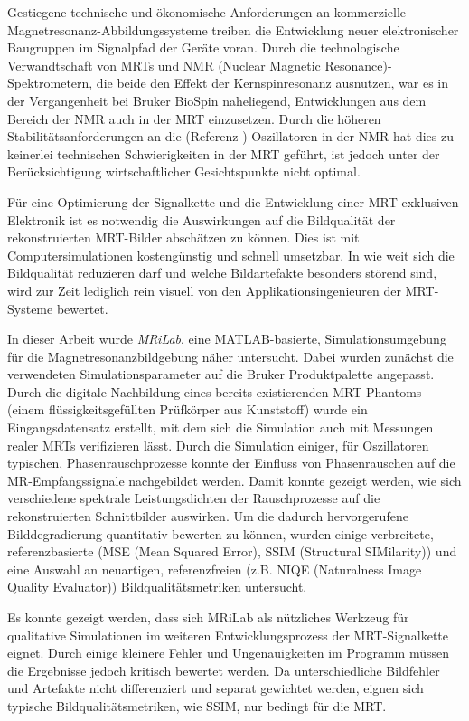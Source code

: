 Gestiegene technische und ökonomische Anforderungen an kommerzielle Magnetresonanz-Abbildungssysteme treiben die Entwicklung neuer elektronischer Baugruppen im Signalpfad der Geräte voran. Durch die technologische Verwandtschaft von MRTs und NMR (Nuclear Magnetic Resonance)-Spektrometern, die beide den Effekt der Kernspinresonanz ausnutzen, war es in der Vergangenheit bei Bruker BioSpin naheliegend, Entwicklungen aus dem Bereich der NMR auch in der MRT einzusetzen. Durch die höheren Stabilitätsanforderungen an die (Referenz-) Oszillatoren in der NMR hat dies zu keinerlei technischen Schwierigkeiten in der MRT geführt, ist jedoch unter der Berücksichtigung wirtschaftlicher Gesichtspunkte nicht optimal.

Für eine Optimierung der Signalkette und die Entwicklung einer MRT exklusiven Elektronik ist es notwendig die Auswirkungen auf die Bildqualität der rekonstruierten MRT-Bilder abschätzen zu können. Dies ist mit Computersimulationen kostengünstig und schnell umsetzbar. In wie weit sich die Bildqualität reduzieren darf und welche Bildartefakte besonders störend sind, wird zur Zeit lediglich rein visuell von den Applikationsingenieuren der MRT-Systeme bewertet.

In dieser Arbeit wurde \textit{MRiLab}, eine MATLAB-basierte, Simulationsumgebung für die Magnetresonanzbildgebung näher untersucht. Dabei wurden zunächst die verwendeten Simulationsparameter auf die Bruker Produktpalette angepasst. Durch die digitale Nachbildung eines bereits existierenden MRT-Phantoms (einem flüssigkeitsgefüllten Prüfkörper aus Kunststoff) wurde ein Eingangsdatensatz erstellt, mit dem sich die Simulation auch mit Messungen realer MRTs verifizieren lässt. Durch die Simulation einiger, für Oszillatoren typischen, Phasenrauschprozesse konnte der Einfluss von Phasenrauschen auf die MR-Empfangssignale nachgebildet werden. Damit konnte gezeigt werden, wie sich verschiedene spektrale Leistungsdichten der Rauschprozesse auf die rekonstruierten Schnittbilder auswirken.
Um die dadurch hervorgerufene Bilddegradierung quantitativ bewerten zu können, wurden einige verbreitete, referenzbasierte (MSE (Mean Squared Error), SSIM (Structural SIMilarity)) und eine Auswahl an neuartigen, referenzfreien (z.B. NIQE (Naturalness Image Quality Evaluator)) Bildqualitätsmetriken untersucht.

Es konnte gezeigt werden, dass sich MRiLab als nützliches Werkzeug für qualitative Simulationen im weiteren Entwicklungsprozess der MRT-Signalkette eignet. Durch einige kleinere Fehler und Ungenauigkeiten im Programm müssen die Ergebnisse jedoch kritisch bewertet werden. Da unterschiedliche Bildfehler und Artefakte nicht differenziert und separat gewichtet werden, eignen sich typische Bildqualitätsmetriken, wie SSIM, nur bedingt für die MRT.


